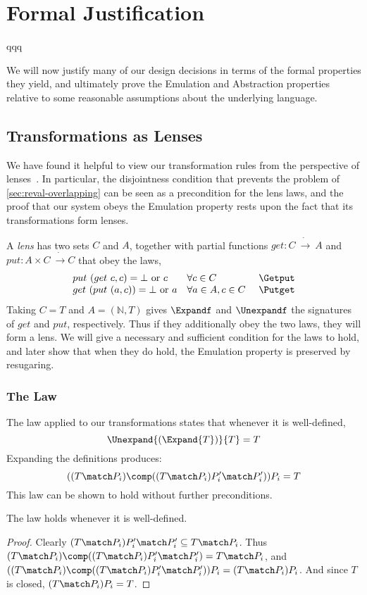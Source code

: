 \section{Formal Justification}
\label{sec:reval-formal}

qqq

We will now justify many of our design decisions in terms of the formal
properties they yield, and ultimately prove the Emulation and Abstraction
properties relative to some reasonable assumptions about the underlying
language.

\subsection{Transformations as Lenses}
\label{sec:reval-lenses}

We have found it helpful to view our transformation rules from the
perspective of lenses~\cite{fgkps:comb-bidir-tree-trans}. In
particular, the disjointness condition that prevents the 
problem of \cref{sec:reval-overlapping} can be seen as a precondition for the
lens laws, and the proof that our system obeys the Emulation property
rests upon the fact that its transformations form lenses.

A \emph{lens} has two sets $C$ and $A$, together with partial
functions $get : C\ \dot{\to}\ A$ and $put : A \times
C\ \dot{\to} C$ that obey the laws,
\[\begin{array}{lllll}
put\ (get\ c, c) = \bot \text{ or } c
  & \forall c \in C
  & \text{ \Getput} \\
get\ (put\ (a, c)) = \bot \text{ or } a
  & \forall a \in A, c \in C
  & \text{ \Putget}
\end{array}\]
Taking $C = T$ and $A = (\mathbb{N}, T)$ gives $\Expandf$ and
$\Unexpandf$ the signatures of $get$ and $put$,
respectively. Thus if they additionally obey the two laws, they will
form a lens. We will give a necessary and sufficient condition for the
laws to hold, and later show that when they do hold, the Emulation
property is preserved by resugaring.

\subsubsection{The {\Getput} Law}
\label{sec:reval-getput}
The {\Getput} law applied to our transformations states that whenever it
is well-defined,
\[ \Unexpand{(\Expand{T})}{T} = T \]
Expanding the definitions produces:
\[ ((T \match P_i) \comp ((T \match P_i)P_i' \match P_i'))P_i = T \]
This law can be shown to hold without further preconditions.
\begin{lemma} The {\Getput} law holds whenever it is well-defined.
\end{lemma}
\begin{proof}
Clearly $(T \match P_i) P_i' \match P_i' \subseteq T \match P_i$.
Thus $(T \match P_i) \comp ((T \match P_i) P_i' \match P_i')
 = T \match P_i$,
and $((T \match P_i) \comp ((T \match P_i) P_i' \match P_i')) P_i
 = (T \match P_i) P_i$.
And since $T$ is closed, $(T \match P_i) P_i = T$.
\end{proof}

